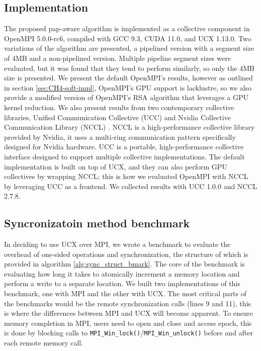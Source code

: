 \subsection{Implementation}
The proposed pap-aware algorithm is implemented as a collective component in OpenMPI 5.0.0-rc6, compiled with GCC 9.3, CUDA 11.0, and UCX 1.13.0. 
Two variations of the algorithm are presented, a pipelined version with a segment size of 4MB and a non-pipelined version.
Multiple pipeline segment sizes were evaluated, but it was found that they tend to perform similarly, so only the 4MB size is presented.
We present the default OpenMPI's results, however as outlined in section \ref{sec:CH4-soft-impl}, OpenMPI's GPU support is lacklustre, so we also provide a modified version of OpenMPI's RSA algorithm that leverages a GPU kernel reduction. 
We also present results from two contemporary collective libraries, Unified Communication Collective (UCC) \cite{UCC} and Nvidia Collective Communication Library (NCCL) \cite{NCCL}.
NCCL is a high-performance collective library provided by Nvidia, it uses a multi-ring communication pattern specifically designed for Nvidia hardware.
UCC is a portable, high-performance collective interface designed to support multiple collective implementations.
The default implementation is built on top of UCX, and they can also perform GPU collectives by wrapping NCCL; this is how we evaluated OpenMPI with NCCL by leveraging UCC as a frontend.
We collected results with UCC 1.0.0 and NCCL 2.7.8.

\subsection{Syncronizatoin method benchmark}
In deciding to use UCX over MPI, we wrote a benchmark to evaluate the overhead of one-sided operations and synchronization, the structure of which is provided in algorithm \ref{alg:sync_struct_bmark}.
The core of the benchmark is evaluating how long it takes to atomically increment a memory location and perform a write to a separate location.
We built two implementations of this benchmark, one with MPI and the other with UCX. 
The most critical parts of the benchmarks would be the remote synchronization calls (lines 9 and 11), this is where the differences between MPI and UCX will become apparent.  
To ensure memory completion in MPI, users need to open and close and access epoch, this is done by blocking calls to \texttt{MPI\_Win\_lock()}/\texttt{MPI\_Win\_unlock()} before and after each remote memory call.

